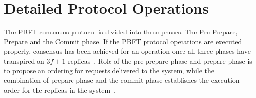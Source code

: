 

\section{Detailed Protocol Operations}
\label{sec:detailedProtocol}
The PBFT consensus protocol is divided into three phases. The Pre-Prepare, Prepare and the Commit phase. If the PBFT protocol operations are executed properly, consensus has been achieved for an operation once all three phases have transpired on $3f+1$ replicas~\cite[p.~257-259]{BOOK:BuildDepDistSyst}. Role of the pre-prepare phase and prepare phase is to propose an ordering for requests delivered to the system, while the combination of prepare phase and the commit phase establishes the execution order for the replicas in the system~\cite[p.~4]{PAPER:OGPBFT}. 

